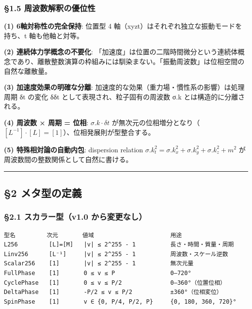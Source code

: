\documentclass[a4paper,11pt]{ltjsarticle}
\begin{document}
\subsubsection{§1.5
周波数解釈の優位性}\label{ux5468ux6ce2ux6570ux89e3ux91c8ux306eux512aux4f4dux6027}

\textbf{(1) 6軸対称性の完全保持}: 位置型 4
軸（xyzt）はそれぞれ独立な振動モードを持ち、t 軸も他軸と対等。

\textbf{(2) 連続体力学概念の不要化}:
「加速度」は位置の二階時間微分という連続体概念であり、離散整数演算の枠組みには馴染まない。「振動周波数」は位相空間の自然な離散量。

\textbf{(3) 加速度効果の明確な分離}:
加速度的な効果（重力場・慣性系の影響）は処理周期 δt の変化 δδt
として表現され、粒子固有の周波数 σ.k とは構造的に分離される。

\textbf{(4) 周波数 × 周期 = 位相}: \(\sigma.k \cdot \delta t\)
が無次元の位相増分となり（\([L^{-1}] \cdot [L] = [1]\)）、位相発展則が型整合する。

\textbf{(5) 特殊相対論の自動内包}: dispersion relation
\(\sigma.k_t^2 = \sigma.k_x^2 + \sigma.k_y^2 + \sigma.k_z^2 + m^2\)
が周波数間の整数関係として自然に書ける。

\begin{center}\rule{0.5\linewidth}{0.5pt}\end{center}

\subsection{§2 メタ型の定義}\label{ux30e1ux30bfux578bux306eux5b9aux7fa9}

\subsubsection{§2.1 スカラー型（v1.0
から変更なし）}\label{ux30b9ux30abux30e9ux30fcux578bv1.0-ux304bux3089ux5909ux66f4ux306aux3057}

\begin{verbatim}
型名         次元       値域                      用途
L256         [L]=[M]   |v| ≤ 2^255 - 1          長さ・時間・質量・周期
Linv256      [L⁻¹]     |v| ≤ 2^255 - 1          周波数・スケール逆数
Scalar256    [1]       |v| ≤ 2^255 - 1          無次元量
FullPhase    [1]       0 ≤ v ≤ P                0–720°
CyclePhase   [1]       0 ≤ v ≤ P/2              0–360°（位置位相）
DeltaPhase   [1]       -P/2 ≤ v ≤ P/2           ±360°（位相変位）
SpinPhase    [1]       v ∈ {0, P/4, P/2, P}     {0, 180, 360, 720}°
\end{verbatim}
\end{document}
